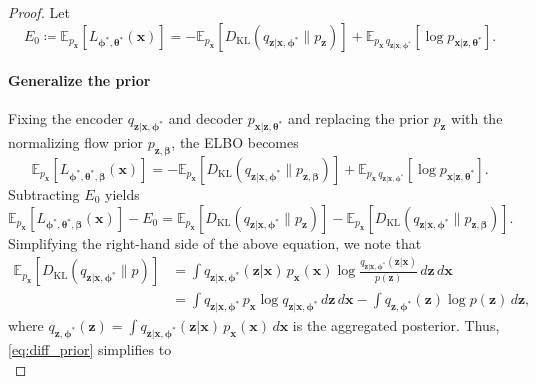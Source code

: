 \documentclass[10pt,a4paper]{amsart}
\newcommand{\mb}{\boldsymbol}
\begin{document}
\begin{proof}

Let 
\begin{equation}
E_0 \coloneqq \mathbb{E}_{p_{\mb{x}}}[L_{\mb{\phi}^*,\mb{\theta}^*}(\mb{x})]
= -\mathbb{E}_{p_{\mb{x}}}[D_{\mathrm{KL}}(q_{\mb{z}|\mb{x},\mb{\phi}^*} \| p_{\mb{z}})]
+ \mathbb{E}_{p_{\mb{x}}\, q_{\mb{z}|\mb{x},\mb{\phi}^*}}[\log p_{\mb{x}|\mb{z},\mb{\theta}^*}].
\end{equation}

\paragraph{Generalize the prior}
Fixing the encoder $q_{\mb{z}|\mb{x},\mb{\phi}^*}$ and decoder $p_{\mb{x}|\mb{z},\mb{\theta}^*}$ and replacing the prior $p_{\mb{z}}$ with the normalizing flow prior $p_{\mb{z},\mb{\beta}}$, the ELBO becomes
\begin{equation}
\mathbb{E}_{p_{\mb{x}}}[L_{\mb{\phi}^*,\mb{\theta}^*,\mb{\beta}}(\mb{x})]
= -\mathbb{E}_{p_{\mb{x}}}[D_{\mathrm{KL}}(q_{\mb{z}|\mb{x},\mb{\phi}^*} \| p_{\mb{z},\mb{\beta}})]
+ \mathbb{E}_{p_{\mb{x}}\, q_{\mb{z}|\mb{x},\mb{\phi}^*}}[\log p_{\mb{x}|\mb{z},\mb{\theta}^*}].
\end{equation}
Subtracting $E_0$ yields
\begin{equation}
\mathbb{E}_{p_{\mb{x}}}[L_{\mb{\phi}^*,\mb{\theta}^*,\mb{\beta}}(\mb{x})] - E_0
= \mathbb{E}_{p_{\mb{x}}}[D_{\mathrm{KL}}(q_{\mb{z}|\mb{x},\mb{\phi}^*} \| p_{\mb{z}})]
- \mathbb{E}_{p_{\mb{x}}}[D_{\mathrm{KL}}(q_{\mb{z}|\mb{x},\mb{\phi}^*} \| p_{\mb{z},\mb{\beta}})].
\label{eq:diff_prior}
\end{equation}
Simplifying the right-hand side of the above equation, we note that
\begin{align}
\mathbb{E}_{p_{\mb{x}}}[D_{\mathrm{KL}}(q_{\mb{z}|\mb{x},\mb{\phi}^*} \| p)]
&= \int q_{\mb{z}|\mb{x},\mb{\phi}^*}(\mb{z}|\mb{x})\, p_{\mb{x}}(\mb{x}) \log \frac{q_{\mb{z}|\mb{x},\mb{\phi}^*}(\mb{z}|\mb{x})}{p(\mb{z})}\, d\mb{z}\, d\mb{x} \nonumber\\
&= \int q_{\mb{z}|\mb{x},\mb{\phi}^*}\, p_{\mb{x}} \log q_{\mb{z}|\mb{x},\mb{\phi}^*}\, d\mb{z}\, d\mb{x}
- \int q_{\mb{z},\mb{\phi}^*}(\mb{z}) \log p(\mb{z})\, d\mb{z},
\end{align}
where $q_{\mb{z},\mb{\phi}^*}(\mb{z}) = \int q_{\mb{z}|\mb{x},\mb{\phi}^*}(\mb{z}|\mb{x})\, p_{\mb{x}}(\mb{x})\, d\mb{x}$ is the aggregated posterior. Thus, \eqref{eq:diff_prior} simplifies to
\begin{equation}

\end{equation}
\end{proof}
\end{document}
